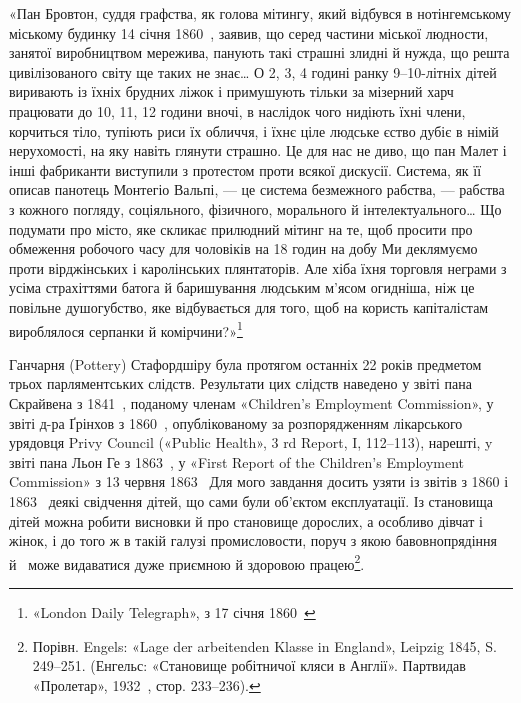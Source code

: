 «Пан Бровтон, суддя графства, як голова мітингу, який
відбувся в нотінгемському міському будинку 14 січня 1860~,
заявив, що серед частини міської людности, занятої виробництвом
мережива, панують такі страшні злидні й нужда, що решта цивілізованого
світу ще таких не знає\dots{} О 2, 3, 4 годині ранку 9--10-літніх
дітей виривають із їхніх брудних ліжок і примушують
тільки за мізерний харч працювати до 10, 11, 12 години вночі,
в наслідок чого нидіють їхні члени, корчиться тіло, тупіють риси
їх обличчя, і їхнє ціле людське єство дубіє в німій нерухомості, на
яку навіть глянути страшно. Це для нас не диво, що пан Малет
і інші фабриканти виступили з протестом проти всякої дискусії.
Система, як її описав панотець Монтегіо Вальпі, — це система безмежного
рабства, — рабства з кожного погляду, соціяльного, фізичного,
морального й інтелектуального\dots{} Що подумати про місто,
яке скликає прилюдний мітинг на те, щоб просити про обмеження
робочого часу для чоловіків на 18 годин на добу Ми деклямуємо
проти вірджінських і каролінських плянтаторів. Але хіба їхня
торговля неграми з усіма страхіттями батога й баришування людським
м’ясом огидніша, ніж це повільне душогубство, яке відбувається
для того, щоб на користь капіталістам вироблялося
серпанки й комірчини?»\footnote{
«London Daily Telegraph», з 17 січня 1860~
}

Ганчарня (Pottery) Стафордшіру була протягом останніх
22 років предметом трьох парляментських слідств. Результати
цих слідств наведено у звіті пана Скрайвена з 1841~, поданому
членам «Children’s Employment Commission», у звіті д-ра
Ґрінхов з 1860~, опублікованому за розпорядженням лікарського
урядовця Privy Council («Public Health», 3 rd Report,
I, 112--113), нарешті, y звіті пана Льон Ге з 1863~, у «First
Report of the Children’s Employment Commission» з 13 червня
1863~ Для мого завдання досить узяти із звітів з 1860 і 1863~
деякі свідчення дітей, що сами були об’єктом експлуатації. Із
становища дітей можна робити висновки й про становище дорослих,
а особливо дівчат і жінок, і до того ж в такій галузі промисловости,
поруч з якою бавовнопрядіння й~ може видаватися
дуже приємною й здоровою працею\footnote{
Порівн. Engels: «Lage der arbeitenden Klasse in England»,
Leipzig 1845, S. 249--251. (Енгельс: «Становище робітничої кляси в
Англії». Партвидав «Пролетар», 1932~, стор. 233--236).
}.

